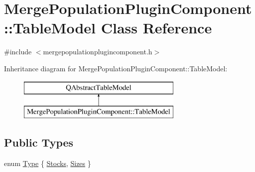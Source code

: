 \hypertarget{class_merge_population_plugin_component_1_1_table_model}{}\section{Merge\+Population\+Plugin\+Component\+::Table\+Model Class Reference}
\label{class_merge_population_plugin_component_1_1_table_model}


{\ttfamily \#include $<$mergepopulationplugincomponent.\+h$>$}

Inheritance diagram for Merge\+Population\+Plugin\+Component\+::Table\+Model\+:\begin{figure}[H]
\begin{center}
\leavevmode
\includegraphics[height=2.000000cm]{d4/d64/class_merge_population_plugin_component_1_1_table_model}
\end{center}
\end{figure}
\subsection*{Public Types}
\begin{DoxyCompactItemize}
\item 
enum \mbox{\hyperlink{class_merge_population_plugin_component_1_1_table_model_aedcae9b9dcacd928610323861dcb1258}{Type}} \{ \mbox{\hyperlink{class_merge_population_plugin_component_1_1_table_model_aedcae9b9dcacd928610323861dcb1258a0a9e395b0ade6fbda8d302a8eb0b6a80}{Stocks}}, 
\mbox{\hyperlink{class_merge_population_plugin_component_1_1_table_model_aedcae9b9dcacd928610323861dcb1258a252feb6cfeae0e05b32044292ee80d8e}{Sizes}}
 \}
\end{DoxyCompactItemize}
